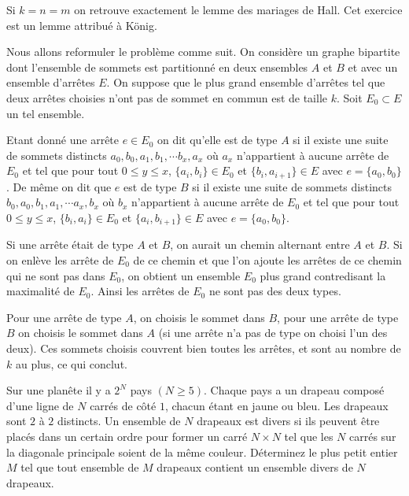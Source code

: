 \begin{sol}
Si $k=n=m$ on retrouve exactement le lemme des mariages de Hall. Cet exercice est un lemme attribué à König.

\medskip

Nous allons reformuler le problème comme suit. On considère un graphe bipartite dont l'ensemble de sommets est partitionné en deux ensembles $A$ et $B$ et avec un ensemble d'arrêtes $E$. On suppose que le plus grand ensemble d'arrêtes tel que deux arrêtes choisies n'ont pas de sommet en commun est de taille $k$. Soit $E_0\subset E$ un tel ensemble.

\medskip

 Etant donné une arrête $e\in E_0$ on dit qu'elle est de type $A$ si il existe une suite de sommets distincts $a_0, b_0,a_1,b_1,\cdots b_x,a_x$ où $a_x$ n'appartient à aucune arrête de $E_0$ et tel que pour tout $0\leq y\leq x$, $\{a_i,b_i\}\in E_0$ et $\{b_i,a_{i+1}\}\in E$ avec $e=\{a_0,b_0\}$.
 De même on dit que $e$ est de type $B$ si il existe une suite de sommets distincts $b_0, a_0,b_1,a_1,\cdots a_x,b_x$ où $b_x$ n'appartient à aucune arrête de $E_0$ et tel que pour tout $0\leq y\leq x$, $\{b_i,a_i\}\in E_0$ et $\{a_i,b_{i+1}\}\in E$ avec $e=\{a_0,b_0\}$.

 \medskip

 Si une arrête était de type $A$ et $B$, on aurait un chemin alternant entre $A$ et $B$. Si on enlève les arrête de $E_0$ de ce chemin et que l'on ajoute les arrêtes de ce chemin qui ne sont pas dans $E_0$, on obtient un ensemble $E_0$ plus grand contredisant la maximalité de $E_0$. Ainsi les arrêtes de $E_0$ ne sont pas des deux types.

 \medskip

 Pour une arrête de type $A$, on choisis le sommet dans $B$, pour une arrête de type $B$ on choisis le sommet dans $A$ (si une arrête n'a pas de type on choisi l'un des deux). Ces sommets choisis couvrent bien toutes les arrêtes, et sont au nombre de $k$ au plus, ce qui conclut.

\end{sol}

\begin{exo}%

Sur une planête il y a $2^N$ pays $(N \geq 5).$ Chaque pays a un drapeau composé d'une ligne de $N$ carrés de côté $1$, chacun étant en jaune ou bleu. Les drapeaux sont $2$ à $2$ distincts. Un ensemble de $N$ drapeaux est divers si ils peuvent être placés dans un certain ordre pour former un carré $N \times N$ tel que les $N$ carrés sur la diagonale principale soient de la même couleur. Déterminez le plus petit entier $M$ tel que tout ensemble de $M$ drapeaux contient un ensemble divers de $N$ drapeaux.
\end{exo}


